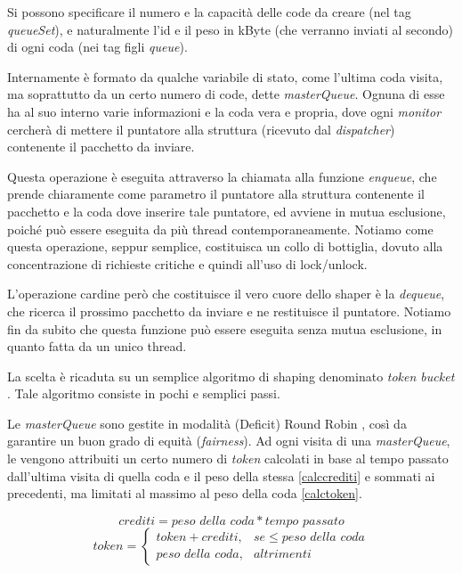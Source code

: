 Si possono specificare il numero e la capacità delle code da creare (nel tag \emph{queueSet}), e naturalmente l'id e il peso in kByte (che verranno inviati al secondo) di ogni coda (nei tag figli \emph{queue}).

Internamente è formato da qualche variabile di stato, come l'ultima coda visita, ma soprattutto da un certo numero di code, dette \emph{masterQueue}. Ognuna di esse ha al suo interno varie informazioni e la coda vera e propria, dove ogni \emph{monitor} cercherà di mettere il puntatore alla struttura (ricevuto dal \emph{dispatcher}) contenente il pacchetto da inviare.

Questa operazione è eseguita attraverso la chiamata alla funzione \emph{enqueue}, che prende chiaramente come parametro il puntatore alla struttura contenente il pacchetto e la coda dove inserire tale puntatore, ed avviene in mutua esclusione, poiché può essere eseguita da più thread contemporaneamente. Notiamo come questa operazione, seppur semplice, costituisca un collo di bottiglia, dovuto alla concentrazione di richieste critiche e quindi all'uso di lock/unlock.

L'operazione cardine però che costituisce il vero cuore dello shaper è la \emph{dequeue}, che ricerca il prossimo pacchetto da inviare e ne restituisce il puntatore. Notiamo fin da subito che questa funzione può essere eseguita senza mutua esclusione, in quanto fatta da un unico thread.

La scelta è ricaduta su un semplice algoritmo di shaping denominato \emph{token bucket} \cite{tba}. Tale algoritmo consiste in pochi e semplici passi.

Le \emph{masterQueue} sono gestite in modalità (Deficit) Round Robin \cite{drr}, così da garantire un buon grado di equità (\emph{fairness}). Ad ogni visita di una \emph{masterQueue}, le vengono attribuiti un certo numero di \emph{token} calcolati in base al tempo passato dall'ultima visita di quella coda e il peso della stessa \eqref{calccrediti} e sommati ai precedenti, ma limitati al massimo al peso della coda \eqref{calctoken}.

\begin{equation}\label{calccrediti}
\textit{crediti} = {\textit{peso della coda}} * {\textit{tempo passato}}
\end{equation}
\begin{equation}\label{calctoken}
\textit{token} = \begin{cases} \textit{token} + \textit{crediti}, & se \leq \textit{peso della coda} \\ \textit{peso della coda}, & altrimenti\end{cases}
\end{equation}

